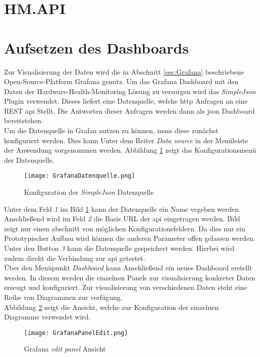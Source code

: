 \section{HM.API}
\newpage
\section{Aufsetzen des Dashboards}
Zur Visualisierung der Daten wird die in Abschnitt \ref{sec:Grafana} beschriebene Open-Source-Platform Grafana genutz. Um das Grafana Dashboard mit den Daten der Hardware-Health-Monitoring Lösung zu versorgen wird das \textit{SimpleJson} Plugin verwendet. Dieses liefert eine Datenquelle, welche \ac{http} Anfragen an eine REST \ac{api} Stellt. Die Antworten dieser Anfragen werden dann als \ac{json} Dashboard bereitstehen.\\
Um die Datenquelle in Grafan nutzen zu können, muss diese zunächst konfiguriert werden. Dies kann Unter dem Reiter \textit{Data source} in der Menüleiste der Anwendung vorgenommen werden. Abbildung \ref{fig:SimpleJSONKonfig} zeigt das Konfigurationsmenü der Datenquelle. 
\begin{center}
    \begin{figure}[h!]
        \centering
        \texttt{[image: GrafanaDatenquelle.png]}
        \caption{Konfiguration der \textit{SimpleJson} Datenquelle}
        \label{fig:SimpleJSONKonfig}
    \end{figure}
\end{center}
Unter dem Feld \textit{1} im Bild \ref{fig:SimpleJSONKonfig} kann der Datenquelle ein Name vegeben werden. Anschließend wird im Feld \textit{2} die Basis URL der \ac{api} eingetragen werden. Bild zeigt nur einen abschnitt von möglichen Konfigurationsfeldern. Da dies nur ein Prototypischer Aufbau wird können die anderen Parameter offen gelassen werden. Unter den Button \textit{3} kann die Datenquelle gespeichert werden. Hierbei wird zudem direkt die Verbindung zur \ac{api} getestet.\\
Über den Menüpunkt \textit{Dashboard} kann Anschließend ein neues Dashboard erstellt werden. In diesem werden die einzelnen Panels zur visualisierung konkreter Daten erzeugt und konfiguriert. Zur visualisierung von verschiedenen Daten steht eine Reihe von Diagrammen zur verfügung.\\
Abbildung \ref{fig:PanelBearbeitung} zeigt die Ansicht, welche zur Konfiguration der einzelnen Diagramme verwendet wird.
\begin{center}
    \begin{figure}[h!]
        \centering
        \texttt{[image: GrafanaPanelEdit.png]}
        \caption{Grafana \textit{edit panel} Ansicht}
        \label{fig:PanelBearbeitung}
    \end{figure}
\end{center}
